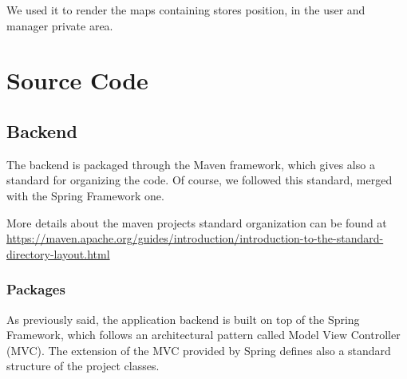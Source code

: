\documentclass[table, 12pt]{article}
\begin{document}
We used it to render the maps containing stores position, in the user and manager private area.

\newpage
\section{Source Code}
\subsection{Backend}
The backend is packaged through the Maven framework, which gives also a standard for organizing the code. Of course, we followed this standard, merged with the Spring Framework one.

More details about the maven projects standard organization can be found at \href{https://maven.apache.org/guides/introduction/introduction-to-the-standard-directory-layout.html}{https://maven.apache.org/guides/introduction/introduction-to-the-standard-directory-layout.html}
\subsubsection{Packages}
As previously said, the application backend is built on top of the Spring Framework, which follows an architectural pattern called Model View Controller (MVC). The extension of the MVC provided by Spring defines also a standard structure of the project classes.
\end{document}
